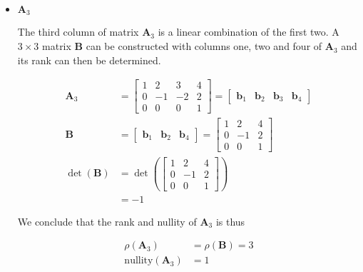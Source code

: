 \begin{itemize}
 \item $\mathbf{A}_3$


The third column of matrix $\mathbf{A}_3$ is a
linear combination of the first two.
A $3 \times 3$ matrix $\mathbf{B}$ can be constructed with
columns one, two and four of $\mathbf{A}_3$ and
its rank can then be determined.

\begin{align*}
 \mathbf{A}_3 &= \begin{bmatrix}
                    1 & 2 & 3 & 4\\
      0 & -1 & -2 & 2\\
      0 & 0 & 0 & 1
                 \end{bmatrix}
= \begin{bmatrix}
   \mathbf{b}_1 & \mathbf{b}_2 & \mathbf{b}_3 & \mathbf{b}_4
  \end{bmatrix}\\
  \mathbf{B} &= \begin{bmatrix}
                 \mathbf{b}_1 & \mathbf{b}_2 & \mathbf{b}_4
                \end{bmatrix}
=
\begin{bmatrix}
                    1 & 2  & 4\\
      0 & -1  & 2\\
      0 & 0  & 1
                 \end{bmatrix}
                 \\
\det(\mathbf{B}) &=\det\left(
\begin{bmatrix}
                    1 & 2  & 4\\
      0 & -1  & 2\\
      0 & 0  & 1
                 \end{bmatrix}
\right)\\
&= -1
\end{align*}

We conclude that the rank and nullity of $\mathbf{A}_3$ is thus

\begin{align*}
 \rho(\mathbf{A}_3) &= \rho(\mathbf{B}) = 3\\
 \text{nullity}(\mathbf{A}_3) &= 1
\end{align*}


\end{itemize}




